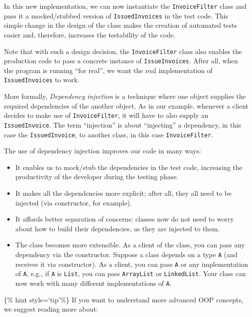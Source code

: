 In this new implementation, we can now instantiate the
\texttt{InvoiceFilter} class and pass it a mocked/stubbed version of
\texttt{IssuedInvoices} in the test code. This simple change in the
design of the class makes the creation of automated tests easier and,
therefore, increases the testability of the code.

Note that with such a design decision, the \texttt{InvoiceFilter} class
also enables the production code to pass a concrete instance of
\texttt{IssueInvoices}. After all, when the program is running ``for
real'', we want the real implementation of \texttt{IssuedInvoices} to
work.

More formally, \emph{Dependency injection} is a technique where one
object supplies the required dependencies of the another object. As in
our example, whenever a client decides to make use of
\texttt{InvoiceFilter}, it will have to also supply an
\texttt{IssuedInvoice}. The term ``injection'' is about ``injecting'' a
dependency, in this case the \texttt{IssuedInvoice}, to another class,
in this case \texttt{InvoiceFilter}.

The use of dependency injection improves our code in many ways:

\begin{itemize}
\tightlist
\item
  It enables us to mock/stub the dependencies in the test code,
  increasing the productivity of the developer during the testing phase.
\item
  It makes all the dependencies more explicit; after all, they all need
  to be injected (via constructor, for example).
\item
  It affords better separation of concerns: classes now do not need to
  worry about how to build their dependencies, as they are injected to
  them.
\item
  The class becomes more extensible. As a client of the class, you can
  pass any dependency via the constructor. Suppose a class depends on a
  type \texttt{A} (and receives it via constructor). As a client, you
  can pass \texttt{A} or any implementation of \texttt{A}, e.g., if
  \texttt{A} is \texttt{List}, you can pass \texttt{ArrayList} or
  \texttt{LinkedList}. Your class can now work with many different
  implementations of \texttt{A}.
\end{itemize}

\{\% hint style=`tip'\%\} If you want to understand more advanced OOP
concepts, we suggest reading more about:

